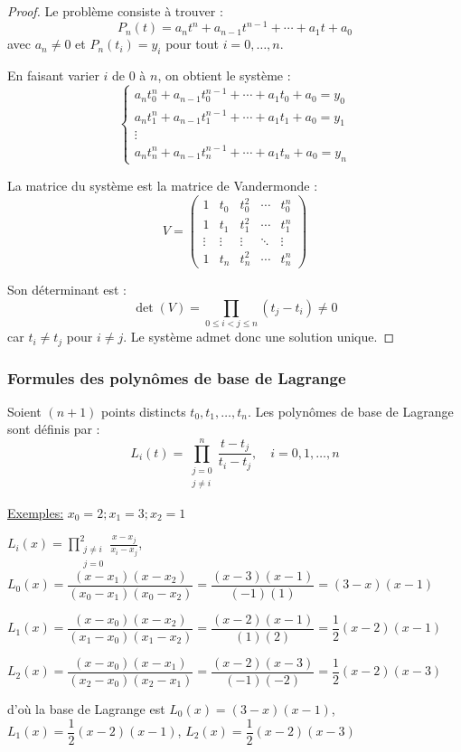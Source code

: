 \begin{proof}
	Le problème consiste à trouver :
	$$P_n(t) = a_n t^n + a_{n-1} t^{n-1} + \cdots + a_1 t + a_0$$
	avec $a_n \neq 0$ et $P_n(t_i) = y_i$ pour tout $i = 0, \ldots, n$.
	
	En faisant varier $i$ de $0$ à $n$, on obtient le système :
	$$\begin{cases}
	a_n t_0^n + a_{n-1} t_0^{n-1} + \cdots + a_1 t_0 + a_0 = y_0 \\
	a_n t_1^n + a_{n-1} t_1^{n-1} + \cdots + a_1 t_1 + a_0 = y_1 \\
	\vdots \\
	a_n t_n^n + a_{n-1} t_n^{n-1} + \cdots + a_1 t_n + a_0 = y_n
	\end{cases}$$
	
	La matrice du système est la matrice de Vandermonde :
	$$V = \begin{pmatrix}
	1 & t_0 & t_0^2 & \cdots & t_0^n \\
	1 & t_1 & t_1^2 & \cdots & t_1^n \\
	\vdots & \vdots & \vdots & \ddots & \vdots \\
	1 & t_n & t_n^2 & \cdots & t_n^n
	\end{pmatrix}$$
	
	Son déterminant est :
	$$\det(V) = \displaystyle\prod_{0 \leq i < j \leq n} (t_j - t_i) \neq 0$$
	car $t_i \neq t_j$ pour $i \neq j$. Le système admet donc une solution unique.
\end{proof}

\subsubsection{Formules des polynômes de base de Lagrange}

\begin{definition}
	Soient $(n+1)$ points distincts $t_0, t_1, \ldots, t_n$. Les polynômes de base de Lagrange sont définis par :
	$$L_i(t) = \displaystyle\prod_{\substack{j=0 \\ j \neq i}}^n \frac{t - t_j}{t_i - t_j}, \quad i = 0, 1, \ldots, n$$
\end{definition}
\underline{Exemples:} $x_{0}=2; x_{1}=3; x_{2}=1$

\begin{flushleft}
	$L_i(x) = \displaystyle\prod_{\substack{j \neq i \\j=0 }}^{2} \frac{x - x_j}{x_i - x_j}$,\\
	
	$L_{0}(x)= \dfrac{(x-x_{1})(x-x_{2})}{(x_{0}-x_{1})(x_{0}-x_{2})} = \dfrac{(x-3)(x-1)}{(-1)(1)}=(3-x)(x-1)$
	
	$L_{1}(x)= \dfrac{(x-x_{0})(x-x_{2})}{(x_{1}-x_{0})(x_{1}-x_{2})} =\dfrac{(x-2)(x-1)}{(1)(2)}= \dfrac{1}{2}(x-2)(x-1)$
	
	$L_{2}(x)= \dfrac{(x-x_{0})(x-x_{1})}{(x_{2}-x_{0})(x_{2}-x_{1})} =\dfrac{(x-2)(x-3)}{(-1)(-2)}= \dfrac{1}{2}(x-2)(x-3)$
	
	d'où la base de Lagrange est $L_{0}(x)=(3-x)(x-1)$, $L_{1}(x)=\dfrac{1}{2}(x-2)(x-1)$, $L_{2}(x)= \dfrac{1}{2}(x-2)(x-3)$
\end{flushleft}

